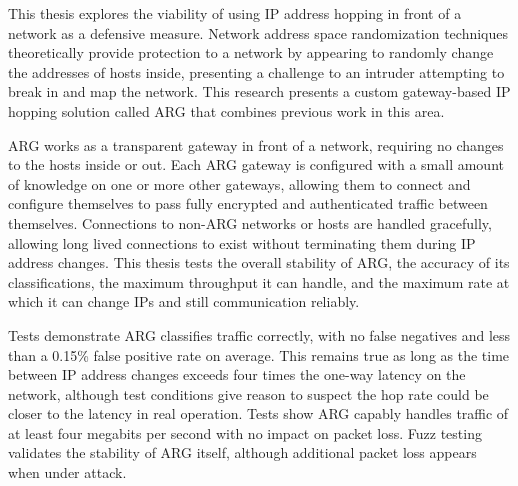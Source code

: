 \par This thesis explores the viability of using \ac{IP} address hopping in front of a network as a defensive measure. Network address space randomization techniques theoretically provide protection to a network by appearing to randomly change the addresses of hosts inside, presenting a challenge to an intruder attempting to break in and map the network. This research presents a custom gateway-based \ac{IP} hopping solution called \ac{ARG} that combines previous work in this area.

\par \ac{ARG} works as a transparent gateway in front of a network, requiring no changes to the hosts inside or out. Each \ac{ARG} gateway is configured with a small amount of knowledge on one or more other gateways, allowing them to connect and configure themselves to pass fully encrypted and authenticated traffic between themselves. Connections to non-\ac{ARG} networks or hosts are handled gracefully, allowing long lived connections to exist without terminating them during \ac{IP} address changes. This thesis tests the overall stability of \ac{ARG}, the accuracy of its classifications, the maximum throughput it can handle, and the maximum rate at which it can change \acp{IP} and still communication reliably.

\par Tests demonstrate \ac{ARG} classifies traffic correctly, with no false negatives and less than a 0.15\% false positive rate on average. This remains true as long as the time between \ac{IP} address changes exceeds four times the one-way latency on the network, although test conditions give reason to suspect the hop rate could be closer to the latency in real operation. Tests show \ac{ARG} capably handles traffic of at least four megabits per second with no impact on packet loss. Fuzz testing validates the stability of \ac{ARG} itself, although additional packet loss appears when under attack.


